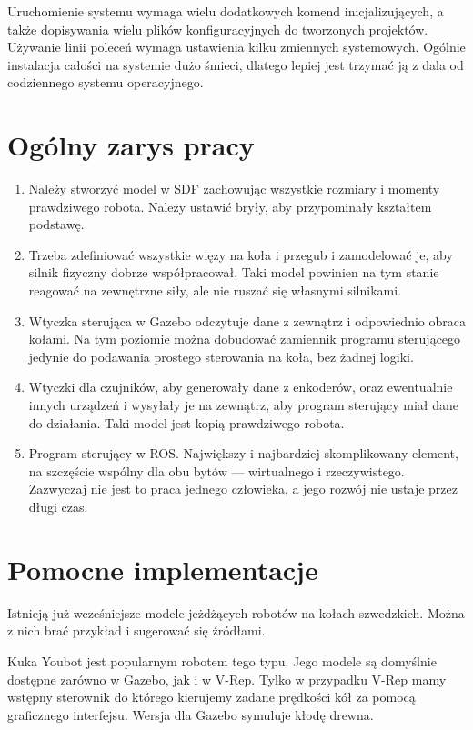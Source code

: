 Uruchomienie systemu wymaga wielu dodatkowych komend inicjalizujących, a także dopisywania wielu plików konfiguracyjnych do tworzonych projektów.
Używanie linii poleceń wymaga ustawienia kilku zmiennych systemowych.
Ogólnie instalacja całości na systemie dużo śmieci, dlatego lepiej jest trzymać ją z dala od codziennego systemu operacyjnego.

\section{Ogólny zarys pracy}
\begin{enumerate}
 \item Należy stworzyć model w SDF zachowując wszystkie rozmiary i momenty prawdziwego robota.
Należy ustawić bryły, aby przypominały kształtem podstawę.

\item Trzeba zdefiniować wszystkie więzy na koła i przegub i zamodelować je, aby silnik fizyczny dobrze współpracował.
Taki model powinien na tym stanie reagować na zewnętrzne siły, ale nie ruszać się własnymi silnikami.

\item Wtyczka sterująca w Gazebo odczytuje dane z zewnątrz i odpowiednio obraca kołami.
Na tym poziomie można dobudować zamiennik programu sterującego jedynie do podawania prostego sterowania na koła, bez żadnej logiki.

\item Wtyczki dla czujników, aby generowały dane z enkoderów, oraz ewentualnie innych urządzeń i wysyłały je na zewnątrz, aby program sterujący miał dane do działania.
Taki model jest kopią prawdziwego robota.

\item Program sterujący w ROS. Największy i najbardziej skomplikowany element, na szczęście wspólny dla obu bytów --- wirtualnego i rzeczywistego.
Zazwyczaj nie jest to praca jednego człowieka, a jego rozwój nie ustaje przez długi czas.

\end{enumerate}

\section{Pomocne implementacje}
Istnieją już wcześniejsze modele jeżdżących robotów na kołach szwedzkich.
Można z nich brać przykład i sugerować się źródłami.

Kuka Youbot jest popularnym robotem tego typu. Jego modele są domyślnie dostępne zarówno w Gazebo, jak i w V-Rep.
Tylko w przypadku V-Rep mamy wstępny sterownik do którego kierujemy zadane prędkości kół za pomocą graficznego interfejsu.
Wersja dla Gazebo symuluje kłodę drewna.
